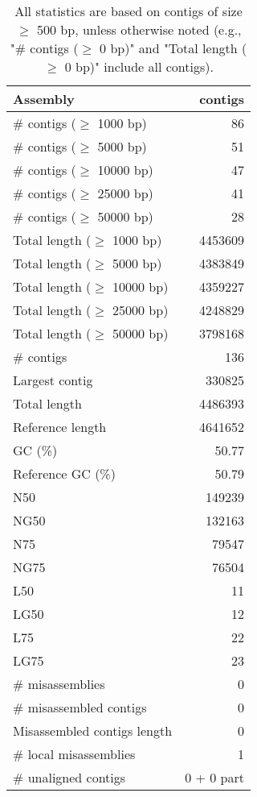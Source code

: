 \documentclass[12pt,a4paper]{article}
\begin{document}
\begin{table}[ht]
\begin{center}
\caption{All statistics are based on contigs of size $\geq$ 500 bp, unless otherwise noted (e.g., "\# contigs ($\geq$ 0 bp)" and "Total length ($\geq$ 0 bp)" include all contigs).}
\begin{tabular}{|l*{1}{|r}|}
\hline
Assembly & contigs \\ \hline
\# contigs ($\geq$ 1000 bp) & 86 \\ \hline
\# contigs ($\geq$ 5000 bp) & 51 \\ \hline
\# contigs ($\geq$ 10000 bp) & 47 \\ \hline
\# contigs ($\geq$ 25000 bp) & 41 \\ \hline
\# contigs ($\geq$ 50000 bp) & 28 \\ \hline
Total length ($\geq$ 1000 bp) & 4453609 \\ \hline
Total length ($\geq$ 5000 bp) & 4383849 \\ \hline
Total length ($\geq$ 10000 bp) & 4359227 \\ \hline
Total length ($\geq$ 25000 bp) & 4248829 \\ \hline
Total length ($\geq$ 50000 bp) & 3798168 \\ \hline
\# contigs & 136 \\ \hline
Largest contig & 330825 \\ \hline
Total length & 4486393 \\ \hline
Reference length & 4641652 \\ \hline
GC (\%) & 50.77 \\ \hline
Reference GC (\%) & 50.79 \\ \hline
N50 & 149239 \\ \hline
NG50 & 132163 \\ \hline
N75 & 79547 \\ \hline
NG75 & 76504 \\ \hline
L50 & 11 \\ \hline
LG50 & 12 \\ \hline
L75 & 22 \\ \hline
LG75 & 23 \\ \hline
\# misassemblies & 0 \\ \hline
\# misassembled contigs & 0 \\ \hline
Misassembled contigs length & 0 \\ \hline
\# local misassemblies & 1 \\ \hline
\# unaligned contigs & 0 + 0 part \\ \hline

\end{tabular}
\end{center}
\end{table}
\end{document}
